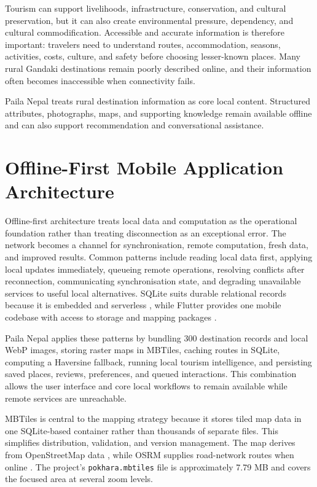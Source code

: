 \documentclass[12pt,a4paper,oneside]{report}
\begin{document}
Tourism can support livelihoods, infrastructure, conservation, and cultural preservation, but it can also create environmental pressure, dependency, and cultural commodification. Accessible and accurate information is therefore important: travelers need to understand routes, accommodation, seasons, activities, costs, culture, and safety before choosing lesser-known places. Many rural Gandaki destinations remain poorly described online, and their information often becomes inaccessible when connectivity fails.

Paila Nepal treats rural destination information as core local content. Structured attributes, photographs, maps, and supporting knowledge remain available offline and can also support recommendation and conversational assistance.

\section{Offline-First Mobile Application Architecture}
\label{sec:offline_first}

Offline-first architecture treats local data and computation as the operational foundation rather than treating disconnection as an exceptional error. The network becomes a channel for synchronisation, remote computation, fresh data, and improved results. Common patterns include reading local data first, applying local updates immediately, queueing remote operations, resolving conflicts after reconnection, communicating synchronisation state, and degrading unavailable services to useful local alternatives. SQLite suits durable relational records because it is embedded and serverless \parencite{SQLite2026}, while Flutter provides one mobile codebase with access to storage and mapping packages \parencite{Flutter2026}.

Paila Nepal applies these patterns by bundling 300 destination records and local WebP images, storing raster maps in MBTiles, caching routes in SQLite, computing a Haversine fallback, running local tourism intelligence, and persisting saved places, reviews, preferences, and queued interactions. This combination allows the user interface and core local workflows to remain available while remote services are unreachable.

MBTiles is central to the mapping strategy because it stores tiled map data in one SQLite-based container rather than thousands of separate files. This simplifies distribution, validation, and version management. The map derives from OpenStreetMap data \parencite{OpenStreetMap2026}, while OSRM supplies road-network routes when online \parencite{OSRM2026}. The project's \texttt{pokhara.mbtiles} file is approximately 7.79 MB and covers the focused area at several zoom levels.
\end{document}
